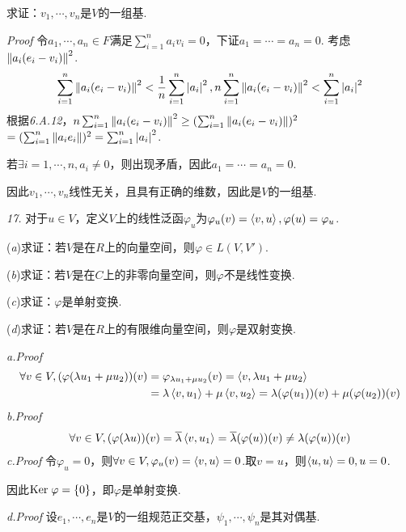 求证：\(v_1,\cdots,v_n\)是\(V\)的一组基.

\textit{Proof}
令\(a_1,\cdots,a_n \in F\)满足\(\sum_{i=1}^n a_iv_i=0\)，下证\(a_1=\cdots=a_n=0\).
考虑\(\left\lVert a_i(e_i-v_i) \right\rVert^2\).
    \begin{align*}
        \sum_{i=1}^n \left\lVert a_i(e_i-v_i) \right\rVert^2<\dfrac{1}{n}\sum_{i=1}^n \left\lvert a_i \right\rvert^2,
        n\sum_{i=1}^n \left\lVert a_i(e_i-v_i) \right\rVert^2<\sum_{i=1}^n \left\lvert a_i \right\rvert^2
    \end{align*}
根据\textit{6.A.12}，\(n\sum_{i=1}^n \left\lVert a_i(e_i-v_i) \right\rVert^2 \geq (\sum_{i=1}^n \left\lVert a_i(e_i-v_i) \right\rVert)^2\)
\(=(\sum_{i=1}^n \left\lVert a_ie_i \right\rVert)^2=\sum_{i=1}^n \left\lvert a_i \right\rvert^2\).

若\(\exists i=1,\cdots,n,a_i \ne 0\)，则出现矛盾，因此\(a_1=\cdots=a_n=0\).

因此\(v_1,\cdots,v_n\)线性无关，且具有正确的维数，因此是\(V\)的一组基.

\newpage

\textit{17.}
对于\(u \in V\)，定义\(V\)上的线性泛函\(\varphi_u\)为\(\varphi_u(v)=\left\langle v,u \right\rangle,\varphi(u)=\varphi_u\).

(\textit{a})求证：若\(V\)是在\(R\)上的向量空间，则\(\varphi \in L(V,V')\).

(\textit{b})求证：若\(V\)是在\(C\)上的非零向量空间，则\(\varphi\)不是线性变换.

(\textit{c})求证：\(\varphi\)是单射变换.

(\textit{d})求证：若\(V\)是在\(R\)上的有限维向量空间，则\(\varphi\)是双射变换.

\textit{a.Proof}
    \begin{align*}
        \forall v \in V,(\varphi(\lambda u_1+\mu u_2))(v)
        &=\varphi_{\lambda u_1+\mu u_2}(v)=\left\langle v,\lambda u_1+\mu u_2 \right\rangle \\
        &=\lambda \left\langle v,u_1 \right\rangle+\mu \left\langle v,u_2 \right\rangle=\lambda (\varphi(u_1))(v)+\mu (\varphi(u_2))(v)
    \end{align*}
\textit{b.Proof}
    \begin{align*}
        \forall v \in V,(\varphi(\lambda u))(v)=\overline{\lambda} \left\langle v,u_1 \right\rangle
        =\overline{\lambda} (\varphi(u))(v) \ne \lambda (\varphi(u))(v)
    \end{align*}
\textit{c.Proof}
令\(\varphi_u=0\)，则\(\forall v \in V,\varphi_u(v)=\left\langle v,u \right\rangle=0\).取\(v=u\)，则\(\left\langle u,u \right\rangle=0,u=0\).

因此\(\mathrm{Ker \;} \varphi=\{0\}\)，即\(\varphi\)是单射变换.

\textit{d.Proof}
设\(e_1,\cdots,e_n\)是\(V\)的一组规范正交基，\(\psi_1,\cdots,\psi_n\)是其对偶基.

